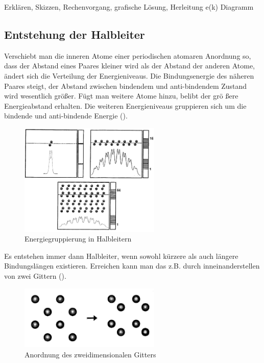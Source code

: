 Erkl\"aren, Skizzen, Rechenvorgang, grafische L\"osung, Herleitung e(k) Diagramm

\subsection{Entstehung der Halbleiter }\label{k2:entstehungHalbleiter}

Verschiebt man die inneren Atome einer periodischen atomaren Anordnung so, dass der Abstand eines Paares kleiner wird als der Abstand der anderen Atome, \"andert sich die Verteilung der Energieniveaus. Die Bindungsenergie des n\"aheren Paares steigt, der Abstand zwischen bindendem und anti-bindendem Zustand wird wesentlich gr\"o{\ss}er. F\"ugt man weitere Atome hinzu, belibt der gr\"o{
\ss}ere Energieabstand erhalten. Die weiteren Energieniveaus gruppieren sich um die bindende und anti-bindende Energie ().

\begin{figure}[h]
        \centering
        \includegraphics[width=0.6\textwidth]{fig/energieHalbleiter}
        \caption{Energiegruppierung in Halbleitern}
        \label{fig:energieHalbleiter}
\end{figure}

Es entstehen immer dann Halbleiter, wenn sowohl k\"urzere als auch l\"angere Bindungsl\"angen existieren. Erreichen kann man das z.B. durch inneinanderstellen von zwei Gittern ().

\begin{figure}[h]
        \centering
        \includegraphics[width=0.6\textwidth]{fig/gitterstrukturen}
        \caption{Anordnung des zweidimensionalen Gitters}
        \label{fig:gitterstrukturen}
\end{figure}

